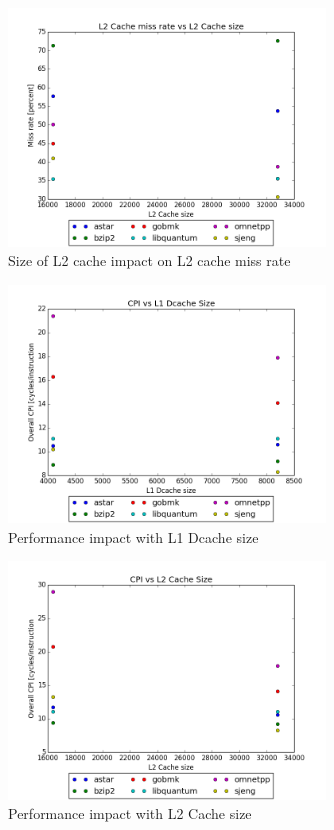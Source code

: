 \documentclass{article}
\begin{document}
\begin{figure}[ht]
    \centering
    \includegraphics[width=0.75\textwidth]{plots/L2cache_miss_vs_size.png}
    \caption{Size of L2 cache impact on L2 cache miss rate}
    \label{fig:l2vsmiss}
\end{figure}

\begin{figure}[ht]
    \centering
    \includegraphics[width=0.75\textwidth]{plots/CPI_vs_L1Dcache_size.png}
    \caption{Performance impact with L1 Dcache size}
    \label{fig:cpivsl1size}
\end{figure}

\begin{figure}[ht]
    \centering
    \includegraphics[width=0.75\textwidth]{plots/CPI_vs_L2Cache_size.png}
    \caption{Performance impact with L2 Cache size}
    \label{fig:cpivsl2size}
\end{figure}
\end{document}

